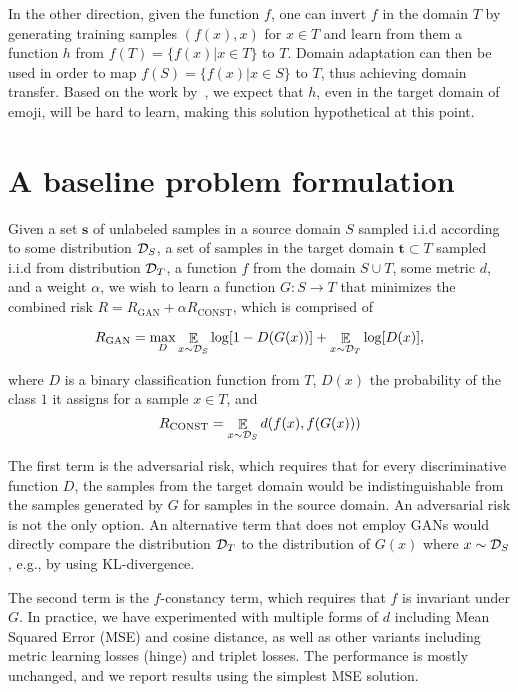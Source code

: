 \documentclass{article} \usepackage{iclr2017_conference,times}
\DeclareMathOperator{\E}{\mathbb{E}}
\begin{document}
In the other direction, given the function $f$, one can invert $f$ in the domain $T$ by generating training samples $(f(x),x)$ for $x\in T$ and learn from them a function $h$ from $f(T) = \{f(x) | x\in T\}$ to $T$. Domain adaptation can then be used in order to map $f(S) = \{f(x) | x\in S\}$ to $T$, thus achieving domain transfer.  Based on the work by~\citet{googlesomething}, we expect that $h$, even in the target domain of emoji, will be hard to learn, making this solution hypothetical at this point.

\section{A baseline problem formulation}
\label{sec:baseline}

Given a set $\mathbf{s}$ of unlabeled samples in a source domain $S$ sampled i.i.d according to some distribution ${\cal D}_S$, a set of samples in the target domain $\mathbf{t} \subset T$ sampled i.i.d from distribution ${\cal D}_T$, a function $f$ from the domain $S \cup T$, some metric $d$, and a weight $\alpha$, we wish to learn a function $G:S \rightarrow T$ that minimizes the combined risk $R = R_{\text{GAN}} + \alpha R_{\text{CONST}}$, which is comprised of

\begin{equation}
R_{\text{GAN}} = \max_D \E_{x \sim {\cal D}_S} \log [1-D(G(x))] + \E_{x \sim {\cal D}_T} \log [D(x)], 
\end{equation}

where $D$ is a binary classification function from $T$, $D(x)$ the probability of the class $1$ it assigns for a sample $x \in T$,  and 
\begin{equation}
R_{\text{CONST}} = \E_{x \sim {\cal D}_S} d(f(x),f(G(x)))
\end{equation}

The first term is the adversarial risk, which requires that for every discriminative function $D$, the samples from the target domain would be indistinguishable from the samples generated by $G$ for samples in the source domain. An adversarial risk is not the only option. An alternative term that does not employ GANs would directly compare the distribution ${\cal D}_T$ to the distribution  of $G(x)$ where $x\sim {\cal D}_S$, e.g., by using KL-divergence.

The second term is the $f$-constancy term, which requires that $f$ is invariant under $G$. In practice, we have experimented with multiple forms of $d$ including Mean Squared Error (MSE) and cosine distance, as well as other variants including metric learning losses (hinge) and triplet losses. The performance is mostly unchanged, and we report results using the simplest MSE solution.
\end{document}
